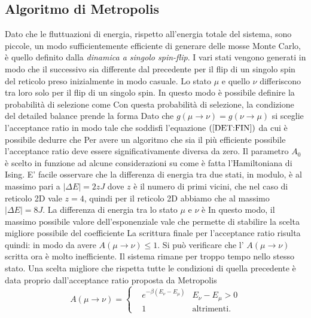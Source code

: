 \documentclass[a4paper,12pt]{article}
\begin{document}
\subsection{Algoritmo di Metropolis}
Dato che le fluttuazioni di energia, rispetto all'energia totale del sistema, sono piccole, un modo sufficientemente efficiente di generare delle mosse Monte Carlo, è quello definito dalla \textit{dinamica a singolo spin-flip}. I vari stati vengono generati in modo che il successivo sia differente dal precedente per il flip di un singolo spin del reticolo preso inizialmente in modo casuale. Lo stato $\mu$ e quello $\nu$ differiscono tra loro solo per il flip di un singolo spin. In questo modo è possibile definire la probabilità di selezione come
Con questa probabilità di selezione, la condizione del detailed balance prende la forma
Dato che $g(\mu\to\nu)=g(\nu\to\mu)$ si sceglie l'acceptance ratio in modo tale che soddisfi l'equazione $(\ref{DET:FIN})$
da cui è possibile dedurre che
Per avere un algoritmo che sia il più efficiente possibile l'acceptance ratio deve essere significativamente diversa da zero. Il parametro $A_0$ è scelto in funzione ad alcune considerazioni
su come è fatta l'Hamiltoniana di Ising. E' facile osservare che la differenza di energia tra due stati, in modulo, è al massimo pari a $|\Delta E|=2zJ$ dove $z$ è il numero di primi vicini, che nel
caso di reticolo 2D vale $z=4$, quindi per il reticolo 2D abbiamo che al massimo $|\Delta E|= 8J$. La differenza di energia tra lo stato $\mu$ e $\nu$ è
In questo modo, il massimo possibile valore dell'esponenziale vale
che permette di stabilire la scelta migliore possibile del coefficiente
La scrittura finale per l'acceptance ratio risulta quindi:
in modo da avere $A(\mu\to\nu) \leq 1$.
Si può verificare che l' $A(\mu\to\nu)$ scritta ora è molto inefficiente. Il sistema rimane per troppo tempo nello stesso stato. Una scelta migliore che rispetta tutte le condizioni di quella precedente è data proprio dall'acceptance ratio proposta da Metropolis
\begin{equation} 
A(\mu\to\nu)=\left\{
        \begin{aligned}
                \label{acc2:ratio}
                &e^{-\beta(E_\nu-E_\mu)} &E_\nu-E_\mu > 0 \\
                &1 &\text{altrimenti.}
        \end{aligned}
        \right.
\end{equation}
\end{document}
